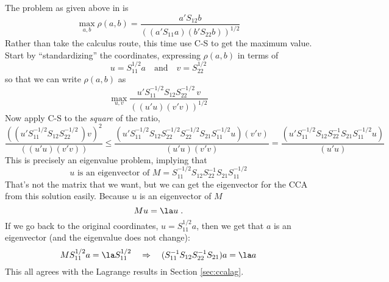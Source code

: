 \documentclass[12pt]{article}
\begin{document}
The problem as given above in  is 
 \begin{equation}
    \max_{a,b} \rho(a,b)=
               \frac{a'S_{12}b}
                    {\left((a'S_{11}a)(b'S_{22}b)\right)^{1/2}}
 \end{equation}
Rather than take the calculus route, this time use C-S to get the maximum
value.  Start by ``standardizing'' the coordinates, expressing $\rho(a,b)$ in
terms of 
 \begin{displaymath}
     u = S_{11}^{1/2} a \quad \mbox{and} \quad  v = S_{22}^{1/2}
 \end{displaymath}
so that we can write $\rho(a,b)$ as
 \begin{displaymath}
    \max_{u,v} \frac{u'S_{11}^{-1/2} S_{12} S_{22}^{-1/2}\,v}
                    {\left((u'u)(v'v)\right)^{1/2}}      
 \end{displaymath}
Now apply C-S to the {\em square} of the ratio,
 \begin{displaymath}
   \frac{((u'S_{11}^{-1/2} S_{12} S_{22}^{-1/2}\,)v)^2}
                    {\left((u'u)(v'v)\right)}
   \le 
   \frac{
    (u'S_{11}^{-1/2}S_{12}S_{22}^{-1/2}S_{22}^{-1/2}S_{21}S_{11}^{-1/2}u)
    (v'v)}
     {(u'u) (v'v) }
   = 
   \frac{
    (u'S_{11}^{-1/2}S_{12}S_{22}^{-1}S_{21}S_{11}^{-1/2}u)}
     {(u'u)}
 \end{displaymath}
 This is precisely an eigenvalue problem, implying that 
 \begin{displaymath}
    u\mbox{ is an eigenvector of }
        M = S_{11}^{-1/2}S_{12}S_{22}^{-1}S_{21}S_{11}^{-1/2}
 \end{displaymath}
 That's not the matrix that we want, but we can get the eigenvector for the CCA
 from this solution easily. Because $u$ is an eigenvector of $M$
 \begin{displaymath}
     M u = \la u \;.
 \end{displaymath}
 If we go back to the original coordinates, $u = S_{11}^{1/2}a$, then we get
 that $a$ is an eigenvector (and the eigenvalue does not change):
 \begin{displaymath}
    M S_{11}^{1/2} a = \la S_{11}^{1/2}  \quad \Rightarrow \quad
    (S_{11}^{-1}S_{12}S_{22}^{-1}S_{21}) a = \la a
 \end{displaymath}
 This all agrees with the Lagrange results in Section \ref{sec:ccalag}.



\end{document}
